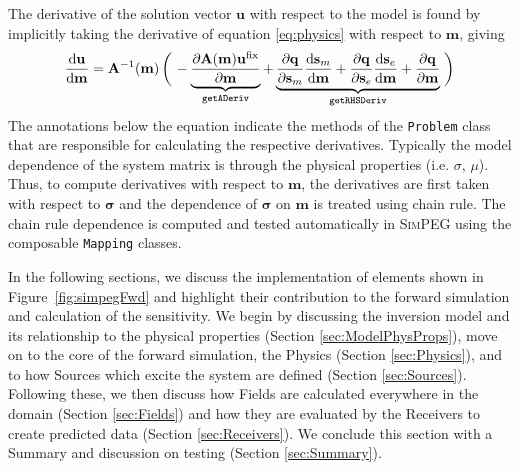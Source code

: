 \documentclass[preprint,review,3p,times,onecolumn,authoryear]{elsarticle}
\newcommand{\SimPEG}{\textsc{SimPEG}\xspace}
\newcommand{\Problem}{\texttt{Problem}\xspace}
\newcommand{\Mapping}{\texttt{Mapping}\xspace}
\newcommand{\sm}{\mathbf{s}_m}
\newcommand{\se}{\mathbf{s}_e}
\begin{document}
The derivative of the solution vector $\mathbf{u}$ with respect to the model
is found by implicitly taking the derivative of equation \ref{eq:physics} with
respect to $\mathbf{m}$, giving
\begin{equation}
    \frac{\text{d}\mathbf{u}}{\text{d}\mathbf{m}} = \mathbf{A}^{-1}(\mathbf{m})
    \left(\vphantom{\frac{\partial \mathbf{A}(\mathbf{m}) \mathbf{u^{\text{fix}}}}{\partial \mathbf{m}}
        } \right.
    - \underbrace{\frac{\partial \mathbf{A}(\mathbf{m}) \mathbf{u^{\text{fix}}}}{\partial \mathbf{m}}
        }_{\texttt{getADeriv}}
        +
\underbrace{
         \frac{\partial\mathbf{q}}{\partial\sm} \frac{\text{d} \sm}{\text{d} \mathbf{m}}
        + \frac{\partial\mathbf{q}}{\partial\se} \frac{\text{d} \se}{\text{d} \mathbf{m}}
        + \frac{\partial\mathbf{q}}{\partial\mathbf{m}}
        }_{\texttt{getRHSDeriv}}
    \left. \vphantom{\frac{\text{d}\mathbf{q}}{\text{d}\sm} \frac{\text{d} \sm}{\text{d} \mathbf{m}}
        + \frac{\text{d}\mathbf{q}}{\text{d}\se} \frac{\text{d} \se}{\text{d} \mathbf{m}}
        + \frac{\partial\mathbf{q}}{\partial\mathbf{m}}}
    \right)
\label{eq:dudm}
\end{equation}
The annotations below the equation indicate the methods of the \Problem class
that are responsible for calculating the respective derivatives. Typically the
model dependence of the system matrix is through the physical properties (i.e.
$\sigma$, $\mu$). Thus, to compute derivatives with respect to $\mathbf{m}$,
the derivatives are first taken with respect to $\boldsymbol{\sigma}$ and the dependence of
$\boldsymbol{\sigma}$ on $\mathbf{m}$ is treated using chain rule. The chain
rule dependence is computed and tested automatically in \SimPEG using the
composable \Mapping classes.

In the following sections, we discuss the implementation of
elements shown in Figure~\ref{fig:simpegFwd} and highlight their contribution
to the forward simulation and calculation of the sensitivity. We begin by
discussing the inversion model and its relationship to the physical properties
(Section \ref{sec:ModelPhysProps}), move on to the core of the forward
simulation, the Physics (Section \ref{sec:Physics}), and to how Sources which excite the
system are defined (Section \ref{sec:Sources}). Following these, we then discuss how Fields are
calculated everywhere in the domain (Section \ref{sec:Fields}) and how they are evaluated by the
Receivers to create predicted data (Section \ref{sec:Receivers}). We conclude this section with a
Summary and discussion on testing (Section \ref{sec:Summary}).
\end{document}
